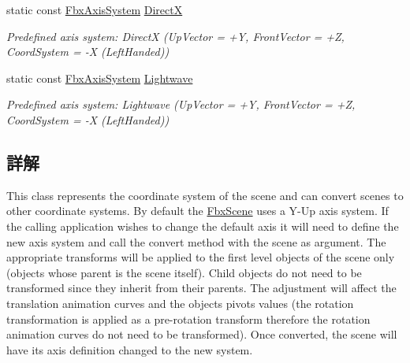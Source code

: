 \begin{DoxyCompactItemize}
static const \hyperlink{class_fbx_axis_system}{Fbx\+Axis\+System} \hyperlink{class_fbx_axis_system_a2eddfe5afe7db5f56adee774c51559e9}{DirectX}
\begin{DoxyCompactList}\small\item\em Predefined axis system\+: DirectX (Up\+Vector = +Y, Front\+Vector = +Z, Coord\+System = -\/X (Left\+Handed)) \end{DoxyCompactList}\item 
static const \hyperlink{class_fbx_axis_system}{Fbx\+Axis\+System} \hyperlink{class_fbx_axis_system_a45fc90ee125c8dafa7ca95f62e7485a8}{Lightwave}
\begin{DoxyCompactList}\small\item\em Predefined axis system\+: Lightwave (Up\+Vector = +Y, Front\+Vector = +Z, Coord\+System = -\/X (Left\+Handed)) \end{DoxyCompactList}\end{DoxyCompactItemize}


\subsection{詳解}
This class represents the coordinate system of the scene and can convert scenes to other coordinate systems. By default the \hyperlink{class_fbx_scene}{Fbx\+Scene} uses a Y-\/\+Up axis system. If the calling application wishes to change the default axis it will need to define the new axis system and call the convert method with the scene as argument. The appropriate transforms will be applied to the first level objects of the scene only (objects whose parent is the scene itself). Child objects do not need to be transformed since they inherit from their parents. The adjustment will affect the translation animation curves and the objects pivots values (the rotation transformation is applied as a pre-\/rotation transform therefore the rotation animation curves do not need to be transformed). Once converted, the scene will have its axis definition changed to the new system.

